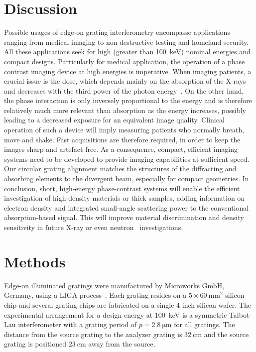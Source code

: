 \documentclass[english]{nature}
\begin{document}
\section*{Discussion}

Possible usages of edge-on grating interferometry encompasse applications
ranging from medical imaging to non-destructive testing and homeland
security. All these applications seek for high (greater than
\SI{100}{\kilo\eV}) nominal energies
and compact designs. Particularly for medical application, the operation of
a phase contrast imaging device at high energies is imperative. When imaging
patients, a crucial issue is the dose, which depends mainly on the
absorption of the X-rays and decreases with the third power of the photon
energy~\cite{Momose2005}. On the other hand, the phase interaction is only inversely
proportional to the energy and is therefore relatively much more relevant
than absorption as the energy increases, possibly leading to a decreased
exposure for an equivalent image quality. Clinical operation of such a
device will imply measuring patients who normally breath, move and shake.
Fast acquisitions are therefore required, in order to keep the images sharp
and artefact free. As a consequence, compact, efficient imaging systems need
to be developed to provide imaging capabilities at sufficient speed. Our
circular grating alignment matches the structures of the diffracting and
absorbing elements to the divergent beam, especially for compact geometries.
In conclusion, short, high-energy phase-contrast systems will enable the
efficient investigation of high-density materials or thick samples, adding
information on electron density and integrated small-angle scattering power
to the conventional absorption-based signal. This will improve material
discrimination and density sensitivity in future X-ray or even
neutron~\cite{Grunzweig2008} investigations.

\section*{Methods}
Edge-on illuminated gratings were manufactured by Microworks GmbH, Germany, using a LIGA process~\cite{Kenntner2010}. Each grating
resides on a $5 \times \SI{60}{\milli\metre^2}$ silicon chip and several
grating chips are fabricated on a single 4 inch silicon wafer. The
experimental arrangement for a design energy at \SI{100}{\kilo\electronvolt}
is a symmetric Talbot-Lau interferometer with a grating period of $p =
\SI{2.8}{\micro \metre}$ for all gratings. The distance from the source
grating to the analyzer grating is $\SI{32}{\centi\metre}$ and the source
grating is positioned $\SI{23}{\centi\metre}$ away from the source.
\end{document}
